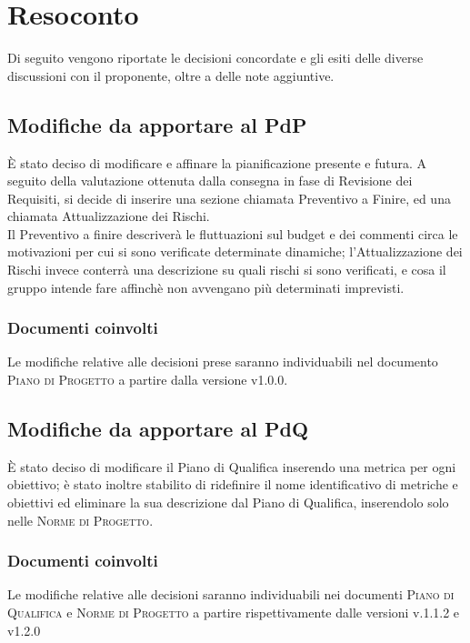 \documentclass{article}
\begin{document}
\section{Resoconto}
\label{sec:resoconto}

Di seguito vengono riportate le decisioni concordate e gli esiti delle diverse discussioni con il proponente, oltre a 
delle note aggiuntive.

\subsection{Modifiche da apportare al PdP}
\label{itm:1}

È stato deciso di modificare e affinare la pianificazione presente e futura. A seguito della valutazione ottenuta dalla consegna in fase di Revisione dei Requisiti, si decide di inserire una sezione chiamata Preventivo a Finire, ed una chiamata Attualizzazione dei Rischi. \\
Il Preventivo a finire descriverà le fluttuazioni sul budget e dei commenti circa le motivazioni per cui si sono verificate determinate dinamiche; l’Attualizzazione dei Rischi invece conterrà una descrizione su quali rischi si sono verificati, e cosa il gruppo intende fare affinchè non avvengano più determinati imprevisti.

\subsubsection*{Documenti coinvolti}
Le modifiche relative alle decisioni prese saranno individuabili nel documento \textsc{Piano di Progetto} a partire 
dalla versione v1.0.0.

\subsection{Modifiche da apportare al PdQ}
\label{itm:2}

È stato deciso di modificare il Piano di Qualifica inserendo una metrica per ogni obiettivo; è stato inoltre stabilito di ridefinire il nome identificativo di metriche e obiettivi ed eliminare la sua descrizione dal Piano di Qualifica, inserendolo solo nelle \textsc{Norme di Progetto}.\\

\subsubsection*{Documenti coinvolti} 
Le modifiche relative alle decisioni saranno individuabili nei documenti \textsc{Piano di Qualifica} e \textsc{Norme di Progetto} a partire rispettivamente dalle versioni v.1.1.2 e v1.2.0
\end{document}
